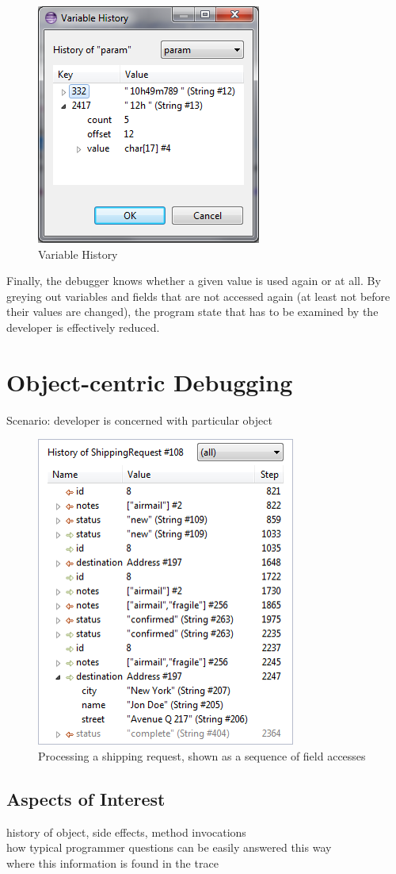 \documentclass[english]{scrartcl}
\begin{document}
\begin{figure}[ht]
\centering
\includegraphics[width=.4\textwidth]{img/history.png}
\caption{Variable History}
\label{fig:history}
\end{figure}

Finally, the debugger knows whether a given value is used again or at all.
By greying out variables and fields that are not accessed again (at least not before their values are changed), the program state that has to be examined by the developer is effectively reduced.

\section{Object-centric Debugging}
Scenario: developer is concerned with particular object\\

\begin{figure}[ht]
\centering
\includegraphics[width=.4\textwidth]{img/objecthistory.png}
\caption{Processing a shipping request, shown as a sequence of field accesses}
\label{fig:history}
\end{figure}

\subsection{Aspects of Interest}
history of object, side effects, method invocations\\
how typical programmer questions can be easily answered this way\\
where this information is found in the trace
\end{document}
